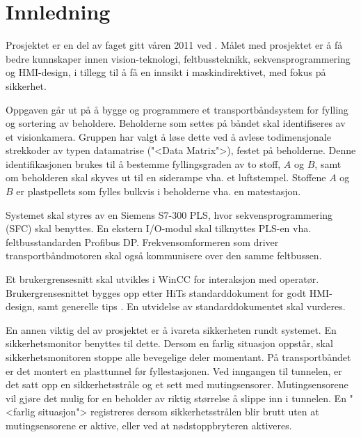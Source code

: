 \documentclass[Visionprosjekt.tex]{subfiles}
\begin{document}
 
  
\section{Innledning}

Prosjektet er en del av faget  \Emnekode{} \Emne{} gitt våren 2011 ved \HiT.
Målet med prosjektet er å få bedre kunnskaper innen  vision-teknologi, feltbussteknikk, sekvensprogrammering og HMI-design, i tillegg til å få en  innsikt i maskindirektivet, med fokus på sikkerhet. 


Oppgaven går ut på å bygge  og programmere et transportbåndsystem for fylling og sortering av beholdere. Beholderne som settes på båndet skal identifiseres av et visionkamera. Gruppen har valgt å løse dette ved å avlese todimensjonale strekkoder av typen datamatrise ("<Data Matrix">), festet på beholderne. Denne identifikasjonen brukes  til å bestemme fyllingsgraden av to stoff, $A$ og $B$, samt om beholderen skal skyves ut til en siderampe vha. et luftstempel. Stoffene $A$ og $B$ er plastpellets som fylles  bulkvis  i beholderne  vha. en matestasjon. 


Systemet skal styres av en Siemens S7-300 PLS, hvor sekvensprogrammering (SFC) skal benyttes.  En  ekstern I/O-modul skal tilknyttes PLS-en vha. feltbusstandarden Profibus DP. Frekvensomformeren som driver transportbåndmotoren skal også kommunisere over den  samme feltbussen.

Et brukergrensesnitt skal utvikles i WinCC for interaksjon med operatør. Brukergrensesnittet bygges opp etter HiTs standarddokument for godt HMI-design, samt generelle tips \cite{HMIstandard,HMIMorten}. En utvidelse av  standarddokumentet skal  vurderes.
%




En annen viktig del av prosjektet er å ivareta sikkerheten rundt systemet. En  sikkerhetsmonitor benyttes til dette. Dersom en farlig situasjon oppstår, skal sikkerhetsmonitoren stoppe alle bevegelige deler momentant. På transportbåndet er det  montert en plasttunnel før fyllestasjonen. Ved inngangen til tunnelen, er det satt opp en sikkerhetsstråle og et sett med mutingsensorer. Mutingsensorene vil gjøre det mulig for en beholder av riktig størrelse å slippe inn i tunnelen. En "<farlig situasjon"> registreres dersom sikkerhetsstrålen blir brutt uten at mutingsensorene er aktive, eller ved at nødstoppbryteren aktiveres.
\end{document}
